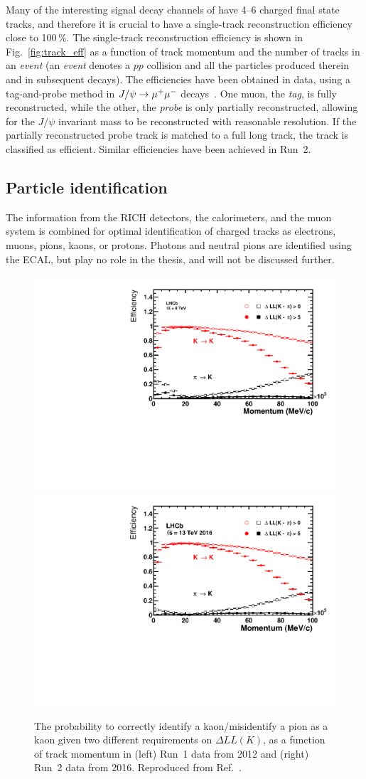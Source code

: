 Many of the interesting signal decay channels of \lhcb have 4--6 charged final state tracks, and therefore it is crucial to have a single-track reconstruction efficiency close to 100\,\%. The single-track reconstruction efficiency is shown in Fig.~\ref{fig:track_eff} as a function of track momentum and the number of tracks in an \emph{event} (an \emph{event} denotes a $pp$ collision and all the particles produced therein and in subsequent decays). The efficiencies have been obtained in data, using a tag-and-probe method in $J/\psi\rightarrow{\ensuremath{\mu^+}}\mu^-$ decays~\cite{TrackEff}. One muon, the \emph{tag}, is fully reconstructed, while the other, the \emph{probe} is only partially reconstructed, allowing for the $J/\psi$ invariant mass to be reconstructed with reasonable resolution. If the partially reconstructed probe track is matched to a full long track, the track is classified as efficient.
Similar efficiencies have been achieved in Run~2.




\subsection{Particle identification} %
\label{sub:particle_identification}
The information from the RICH detectors, the calorimeters, and the muon system is combined for optimal identification of charged tracks as electrons, muons, pions, kaons, or protons. Photons and neutral pions are identified using the ECAL, but play no role in the thesis, and will not be discussed further.

\begin{figure}[tb]
    \centering
    \includegraphics[width=0.45\columnwidth]{figures/detector/PIDK_Run1.pdf}
    \includegraphics[width=0.45\columnwidth]{figures/detector/PIDK_Run2.pdf}
    \caption{The probability to correctly identify a kaon/misidentify a pion as a kaon given two different requirements on $\Delta LL(K)$, as a function of track momentum in (left) Run~1 data from 2012 and (right) Run~2 data from 2016. Reproduced from Ref.~\cite{PIDplots}.}
    \label{fig:PID_performance}
\end{figure}

